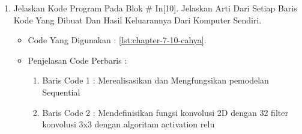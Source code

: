 \begin{enumerate}
\begin{itemize}
\item Code Yang Digunakan : \ref{lst:chapter-7-9-cahya}.

\par
\par
\item Penjelasan Code Perbaris	: 
\begin{enumerate}
\item Baris Code 1	: Melakukan importing fungsi model sequential dari library keras.
\item Baris Code 2	: Melakukan importing fungsi layer dense, dropout, dan flatten dari library keras.
\item Baris Code 3	: Melakukan importing fungsi layer Conv2D dan MaxPooling2D dari library keras.
\end{enumerate}
\par
\item Hasil : \ref{chapter-7-in-9-cahya}
\par
\par
\begin{figure}[!hbtp]
\centering
\texttt{[image: figures/chapter-7-in-9-cahya.jpg]}
\caption{Code Program Pada In [9] - cahya}
\label{chapter-7-in-9-cahya}
\end{figure}
\par
\par
\end{itemize}
\par
\par
\par
\item Jelaskan Kode Program Pada Blok \# In[10]. Jelaskan Arti Dari Setiap Baris Kode Yang Dibuat Dan Hasil Keluarannya Dari Komputer Sendiri.
\begin{itemize}
\item Code Yang Digunakan : \ref{lst:chapter-7-10-cahya}.

\par
\par
\item Penjelasan Code Perbaris : 
\begin{enumerate}
\item Baris Code 1 : Merealisasikan dan Mengfungsikan pemodelan Sequential
\item Baris Code 2 : Mendefinisikan fungsi konvolusi 2D dengan 32 filter konvolusi 3x3 dengan algoritam activation relu

\end{enumerate}
\end{itemize}
\end{enumerate}
